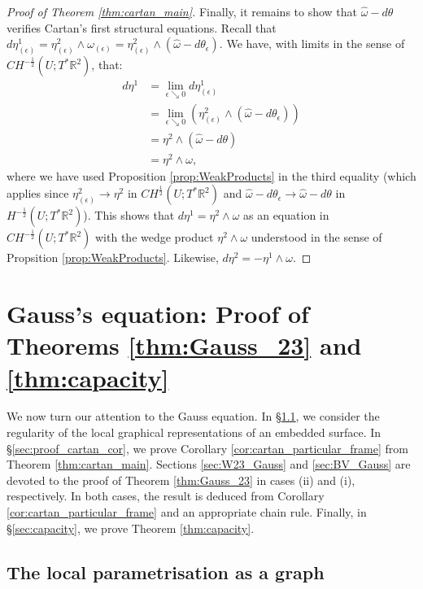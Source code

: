 \documentclass[12pt]{article}
\newcommand{\R}{\mathbb{R}}
\theoremstyle{plain}
\numberwithin{equation}{section}
\begin{document}
\begin{proof}[Proof of Theorem \ref{thm:cartan_main}]
    Finally, it remains to show that $\hat\omega - d\theta$ verifies Cartan's first structural equations. Recall that $d\eta^1_{(\epsilon)} = \eta^2_{(\epsilon)} \wedge \omega_{(\epsilon)} = \eta^2_{(\epsilon)} \wedge (\hat\omega - d\theta_\epsilon)$. We have, with limits in the sense of $CH^{-\frac12}(U;T^*\R^2)$, that:
    \begin{equation*} 
        \begin{split}
        d\eta^1  &= \lim_{\epsilon \searrow 0} d\eta^1_{(\epsilon)}\\
        &= \lim_{\epsilon \searrow 0} (\eta^2_{(\epsilon)} \wedge (\hat\omega - d\theta_\epsilon))\\
        &= \eta^2 \wedge (\hat\omega - d\theta)\\
        &= \eta^2 \wedge \omega,
        \end{split}
    \end{equation*}
    where we have used Proposition \ref{prop:WeakProducts} in the third equality (which applies since $\eta^2_{(\epsilon)} \to \eta^2$ in $CH^\frac12(U;T^*\R^2)$ and $\hat\omega-d\theta_{\epsilon} \to \hat\omega-d\theta$ in $H^{-\frac12}(U;T^*\R^2)$). This shows that $d\eta^1 = \eta^2 \wedge \omega$ as an equation in $CH^{-\frac12}(U;T^*\R^2)$ with the wedge product $\eta^2 \wedge \omega$ understood in the sense of Propsition \ref{prop:WeakProducts}. Likewise, $d\eta^2 = - \eta^1 \wedge \omega$. 
\end{proof}

\section{Gauss's equation: Proof of Theorems \ref{thm:Gauss_23} and \ref{thm:capacity}} \label{sec:gauss}

We now turn our attention to the Gauss equation. In \S \ref{sec:surfs_are_locally_graphical}, we consider the regularity of the local graphical representations of an embedded surface. In \S \ref{sec:proof_cartan_cor}, we prove Corollary \ref{cor:cartan_particular_frame} from Theorem \ref{thm:cartan_main}. Sections \ref{sec:W23_Gauss} and \ref{sec:BV_Gauss} are devoted to the proof of Theorem \ref{thm:Gauss_23} in cases (ii) and (i), respectively. In both cases, the result is deduced from Corollary \ref{cor:cartan_particular_frame} and an appropriate chain rule. Finally, in \S \ref{sec:capacity}, we prove Theorem \ref{thm:capacity}.

\subsection{The local parametrisation as a graph} \label{sec:surfs_are_locally_graphical}
\end{document}
